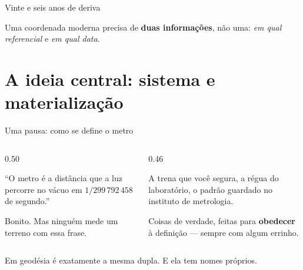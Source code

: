 \documentclass[aspectratio=169,11pt]{beamer}
\newcommand{\bnum}[1]{\textbf{\textcolor{mTeal}{#1}}}
\begin{document}
\begin{frame}{Vinte e seis anos de deriva}
  \centering
  \bigskip

  \begin{ideia}[title={A segunda lição}]
    Uma coordenada moderna precisa de \bnum{duas informações}, não uma:
    \emph{em qual referencial} e \emph{em qual data}.
  \end{ideia}
\end{frame}

\section{A ideia central: sistema e materialização}

\begin{frame}{Uma pausa: como se define o metro}
  \begin{columns}[T]
    \begin{column}{0.50\textwidth}
      \begin{regra}[title={A definição --- o sistema}]
        ``O metro é a distância que a luz percorre no vácuo em
        $1/299\,792\,458$ de segundo.''
      \end{regra}
      \medskip
      Bonito. Mas ninguém mede um terreno com essa frase.
    \end{column}
    \begin{column}{0.46\textwidth}
      \begin{ideia}[title={A materialização --- o frame}]
        A trena que você segura, a régua do laboratório, o padrão guardado no instituto de
        metrologia.
      \end{ideia}
      \medskip
      Coisas de verdade, feitas para \bnum{obedecer} à definição --- sempre com algum
      errinho.
    \end{column}
  \end{columns}
  \bigskip
  \centering
  \alert{Em geodésia é exatamente a mesma dupla.} E ela tem nomes próprios.
\end{frame}
\end{document}
